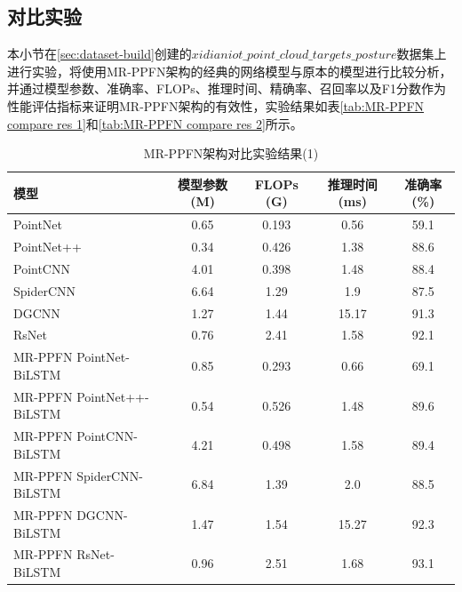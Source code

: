 \subsection{对比实验}
本小节在\eqref{sec:dataset-build}创建的$xidianiot\_point\_cloud\_targets\_posture$数据集上进行实验，将使用MR-PPFN架构的经典的网络模型与原本的模型进行比较分析，并通过模型参数、准确率、FLOPs、推理时间、精确率、召回率以及F1分数作为性能评估指标来证明MR-PPFN架构的有效性，实验结果如表\eqref{tab:MR-PPFN compare res 1}和\eqref{tab:MR-PPFN compare res 2}所示。
\begin{table}[htbp]
    \centering
    \caption{MR-PPFN架构对比实验结果(1)}
    \label{tab:MR-PPFN compare res 1}
    \begin{tabular}{lcccc}
        \toprule
        \textbf{模型} & \textbf{模型参数 (M)} & \textbf{FLOPs (G)} & \textbf{推理时间 (ms)} & \textbf{准确率 (\%)} \\
        \midrule
        PointNet & 0.65 & 0.193 & 0.56 & 59.1 \\
        PointNet++ & 0.34 & 0.426 & 1.38 & 88.6 \\
        PointCNN & 4.01 & 0.398 & 1.48 & 88.4 \\
        SpiderCNN & 6.64 & 1.29 & 1.9 & 87.5 \\
        DGCNN & 1.27 & 1.44 & 15.17 & 91.3 \\
        RsNet & 0.76 & 2.41 & 1.58 & 92.1 \\
        MR-PPFN PointNet-BiLSTM & 0.85 & 0.293 & 0.66 & 69.1 \\
        MR-PPFN PointNet++-BiLSTM & 0.54 & 0.526 & 1.48 & 89.6 \\
        MR-PPFN PointCNN-BiLSTM & 4.21 & 0.498 & 1.58 & 89.4 \\
        MR-PPFN SpiderCNN-BiLSTM & 6.84 & 1.39 & 2.0 & 88.5 \\
        MR-PPFN DGCNN-BiLSTM & 1.47 & 1.54 & 15.27 & 92.3 \\
        MR-PPFN RsNet-BiLSTM & 0.96 & 2.51 & 1.68 & 93.1 \\
        \bottomrule
    \end{tabular}
\end{table}


